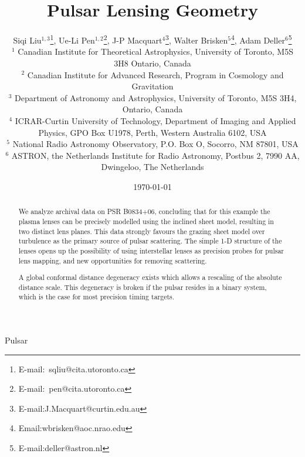 \documentclass[useAMS,usenatbib]{mn2e}
\begin{document}
\title[Lensing Distance]{
Pulsar Lensing Geometry
}

\author[Liu et al]{Siqi Liu$^{1,3}$\thanks{E-mail:\ sqliu@cita.utoronto.ca}, Ue-Li
  Pen$^{1,2}$\thanks{E-mail:\ pen@cita.utoronto.ca}, J-P Macquart$^{4}$\thanks{E-mail:J.Macquart@curtin.edu.au},
  Walter Brisken$^{5}$\thanks{Email:wbrisken@aoc.nrao.edu}, Adam Deller$^{6}$\thanks{E-mail:deller@astron.nl}\\
 $^1$ Canadian Institute for Theoretical Astrophysics, University of Toronto, M5S 3H8 Ontario, Canada \\
$^2$ Canadian Institute for Advanced Research, Program in Cosmology
and Gravitation\\
$^3$ Department of Astronomy and Astrophysics, University of Toronto, M5S 3H4, Ontario, Canada\\
$^4$ ICRAR-Curtin University of Technology, Department of Imaging and Applied Physics, GPO Box U1978, Perth, Western Australia 6102, USA \\
$^5$ National Radio Astronomy Observatory, P.O. Box O, Socorro, NM 87801, USA\\
$^6$ ASTRON, the Netherlands Institute for Radio Astronomy, Postbus 2, 7990 AA, Dwingeloo, The Netherlands\\
}

\date{\today}

\pagerange{\pageref{firstpage}--\pageref{lastpage}} 

\maketitle
\label{firstpage}
\begin{abstract}
We analyze archival data on PSR
B0834+06, concluding that for this example the plasma lenses can be
precisely modelled using the \citep{2014MNRAS.442.3338P} inclined sheet model,
resulting in two distinct lens planes.  This data strongly favours the
grazing sheet model over turbulence as the primary source of
pulsar scattering.  The simple 1-D structure of the lenses opens up
the possibility of using interstellar lenses as precision probes for
pulsar lens mapping, and new opportunities for removing scattering.

A global conformal distance degeneracy exists which allows a rescaling
of the absolute distance scale.  This degeneracy is broken if the
pulsar resides in a binary system, which is the case for most
precision timing targets.

\end{abstract}
\begin{keywords}
Pulsar
\end{keywords}
\end{document}

